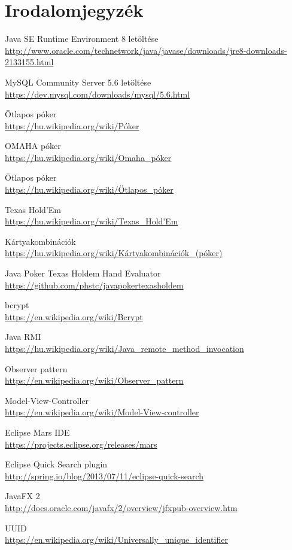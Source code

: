 \part{Irodalomjegyzék}

\begin{thebibliography}{9}

Java SE Runtime Environment 8 letöltése \\
\url{http://www.oracle.com/technetwork/java/javase/downloads/jre8-downloads-2133155.html}

MySQL Community Server 5.6 letöltése \\
\url{https://dev.mysql.com/downloads/mysql/5.6.html}

Ötlapos póker \\
\url{https://hu.wikipedia.org/wiki/Póker}

OMAHA póker \\
\url{https://hu.wikipedia.org/wiki/Omaha_póker}

Ötlapos póker \\
\url{https://hu.wikipedia.org/wiki/Ötlapos_póker}

Texas Hold'Em \\
\url{https://hu.wikipedia.org/wiki/Texas_Hold'Em}

Kártyakombinációk \\
\url{https://hu.wikipedia.org/wiki/Kártyakombinációk_(póker)}

Java Poker Texas Holdem Hand Evaluator \\
\url{https://github.com/phstc/javapokertexasholdem}

bcrypt \\
\url{https://en.wikipedia.org/wiki/Bcrypt}

Java RMI \\
\url{https://hu.wikipedia.org/wiki/Java_remote_method_invocation}

Observer pattern \\
\url{https://en.wikipedia.org/wiki/Observer_pattern}

Model-View-Controller \\
\url{https://en.wikipedia.org/wiki/Model-View-controller}

Eclipse Mars IDE \\
\url{https://projects.eclipse.org/releases/mars}

Eclipse Quick Search plugin \\
\url{http://spring.io/blog/2013/07/11/eclipse-quick-search}

JavaFX 2 \\
\url{http://docs.oracle.com/javafx/2/overview/jfxpub-overview.htm}

UUID \\
\url{https://en.wikipedia.org/wiki/Universally_unique_identifier}



\end{thebibliography}

